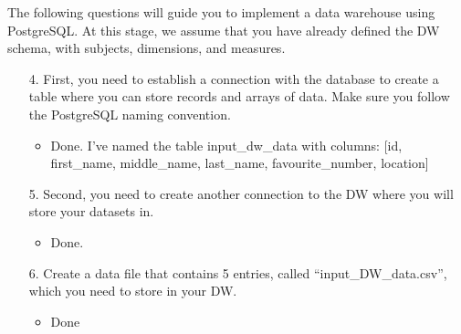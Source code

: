 \documentclass{scrreprt}
\begin{document}
\noindent The following questions will guide you to implement a data warehouse using PostgreSQL. At this stage, we assume that you have already defined the DW schema, with subjects, dimensions, and measures.

\begin{enumerate}
	\item[4.] First, you need to establish a connection with the database to create a table where you can store records and arrays of data. Make sure you follow the PostgreSQL naming convention.
\begin{itemize}
	\item Done. I've named the table input\_dw\_data with columns: [id, first\_name, middle\_name, last\_name, favourite\_number, location]
\end{itemize}
	\item[5.] Second, you need to create another connection to the DW where you will store your datasets in.
\begin{itemize}
	\item Done.
\end{itemize}

	\item[6.] Create a data file that contains 5 entries, called “input\_DW\_data.csv”, which you need to store in your DW.
\begin{itemize}
	\item Done
\end{itemize}


\end{enumerate}
\end{document}
